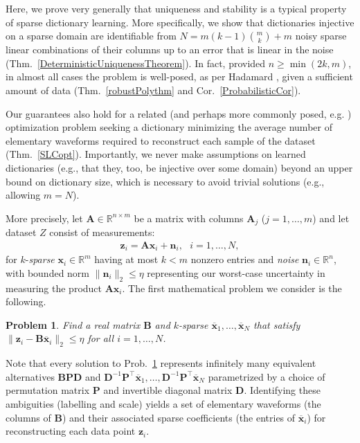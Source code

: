 \documentclass[journal, twocolumn]{IEEEtran}
\newtheorem{problem}{Problem}
\begin{document}
Here, we prove very generally that uniqueness and stability is a typical property of sparse dictionary learning. More specifically,  we show that dictionaries injective on a sparse domain are identifiable from \mbox{$N = m(k-1){m \choose k} + m$} noisy sparse linear combinations of their columns up to an error that is linear in the noise (Thm.~\ref{DeterministicUniquenessTheorem}). In fact, provided $n \geq \min(2k,m)$, in almost all cases the problem is well-posed, as per Hadamard \cite{Hadamard1902}, given a sufficient amount of data (Thm.~\ref{robustPolythm} and Cor.~\ref{ProbabilisticCor}). 

Our guarantees also hold for a related (and perhaps more commonly posed, e.g. \cite{rehnsommer2007}) optimization problem seeking a dictionary minimizing the average number of elementary waveforms required to reconstruct each sample of the dataset (Thm.~\ref{SLCopt}). Importantly, we never make assumptions on learned dictionaries (e.g., that they, too, be injective over some domain) beyond an upper bound on dictionary size, which is necessary to avoid trivial solutions (e.g., allowing $m = N$). %

More precisely, let $\mathbf{A} \in \mathbb R^{n \times m}$ be a matrix with columns $\mathbf{A}_j$ ($j = 1,\ldots,m$) and let dataset $Z$ consist of measurements:
\begin{align}\label{LinearModel}
\mathbf{z}_i = \mathbf{A}\mathbf{x}_i + \mathbf{n}_i,\ \ \  \text{$i=1,\ldots,N$},
\end{align}
for $k$-\emph{sparse} $\mathbf{x}_i \in \mathbb{R}^m$ having at most $k<m$ nonzero entries and \emph{noise} $\mathbf{n}_i \in \mathbb{R}^n$, with bounded norm $\| \mathbf{n}_i \|_2 \leq  \eta$ representing our worst-case uncertainty in measuring the product $\mathbf{A}\mathbf{x}_i$. The first mathematical problem we consider is the following.

\begin{problem}\label{InverseProblem}
Find a real matrix $\mathbf{B}$ and $k$-sparse $\mathbf{\overline x}_1, \ldots, \mathbf{\overline x}_N$ that satisfy $\|\mathbf{z}_i - \mathbf{B}\mathbf{\overline x}_i\|_2 \leq \eta$ for all $i = 1,\ldots,N$.
\end{problem}

Note that every solution to Prob.~\ref{InverseProblem} represents infinitely many equivalent alternatives $\mathbf{BPD}$ and $\mathbf{D}^{-1}\mathbf{P}^{\top}\mathbf{\overline x}_1, \ldots, \mathbf{D}^{-1}\mathbf{P}^{\top}\mathbf{\overline x}_N$ parametrized by a choice of permutation matrix $\mathbf{P}$ and invertible diagonal matrix $\mathbf{D}$. Identifying these ambiguities (labelling and scale) yields a set of elementary waveforms (the columns of $\mathbf{B}$) and their associated sparse coefficients (the entries of $\mathbf{\overline x}_i$) for reconstructing each data point $\mathbf{z}_i$. 
\end{document}

